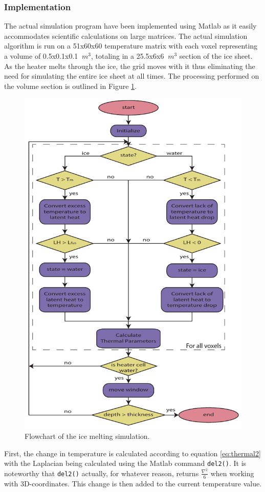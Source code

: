 \subsubsection{Implementation}
The actual simulation program have been implemented using Matlab as it easily accommodates scientific calculations on large matrices. The actual simulation algorithm is run on a 51x60x60 temperature matrix with each voxel representing a volume of 0.5x0.1x0.1 $\SI{}{m^3}$, totaling in a 25.5x6x6 $\SI{}{m^3}$ section of the ice sheet. As the heater melts through the ice, the grid moves with it thus eliminating the need for simulating the entire ice sheet at all times. The processing performed on the volume section is outlined in Figure \ref{fig:iceSimFlow}.\\

 \begin{figure}[ht]
 	\centering
 	\includegraphics[width=.55\textwidth]{figures/LAMC/iceSimFlowchart.pdf}
 	\caption{Flowchart of the ice melting simulation.}
 	\label{fig:iceSimFlow}
 \end{figure}
 
\noindent
First, the change in temperature is calculated according to equation \ref{eq:thermal2} with the Laplacian being calculated using the Matlab command \texttt{del2()}. It is noteworthy that \texttt{del2()} actually, for whatever reason, returns $\frac{\nabla^2}{6}$ when working with 3D-coordinates. This change is then added to the current temperature value.\\

